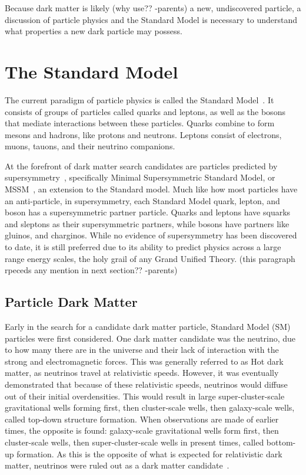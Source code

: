 Because dark matter is {\color{red}likely (why use?? -parents)} a new, undiscovered particle, a discussion of particle physics and the Standard Model is necessary to understand what properties a new dark particle may possess.

\section{The Standard Model}

The current paradigm of particle physics is called the Standard Model~\cite{standardmodel}.
It consists of groups of particles called quarks and leptons, as well as the bosons that mediate interactions between these particles.
Quarks combine to form mesons and hadrons, like protons and neutrons.
Leptons consist of electrons, muons, tauons, and their neutrino companions.

At the forefront of dark matter search candidates are particles predicted by supersymmetry~\cite{Jungman:1995df}, specifically Minimal Supersymmetric Standard Model, or MSSM~\cite{MSSM,supersym1}, an extension to the Standard model.
Much like how most particles have an anti-particle, in supersymmetry, each Standard Model quark, lepton, and boson has a supersymmetric partner particle.
Quarks and leptons have squarks and sleptons as their supersymmetric partners, while bosons have partners like gluinos, and charginos.
While no evidence of supersymmetry has been discovered to date, it is still preferred due to its ability to predict physics across a large range energy scales, the holy grail of any Grand Unified Theory.
{\color{red}(this paragraph rpeceds any mention in next section?? -parents)}


\subsection{Particle Dark Matter}\label{sec_particledm}

Early in the search for a candidate dark matter particle, Standard Model (SM) particles were first considered.
One dark matter candidate was the neutrino, due to how many there are in the universe and their lack of interaction with the strong and electromagnetic forces.
This was generally referred to as Hot dark matter, as neutrinos travel at relativistic speeds.
However, it was eventually demonstrated that because of these relativistic speeds, neutrinos would diffuse out of their initial overdensities.
This would result in large super-cluster-scale gravitational wells forming first, then cluster-scale wells, then galaxy-scale wells, called top-down structure formation.
When observations are made of earlier times, the opposite is found: galaxy-scale gravitational wells form first, then cluster-scale wells, then super-cluster-scale wells in present times, called bottom-up formation.
As this is the opposite of what is expected for relativistic dark matter, neutrinos were ruled out as a dark matter candidate~\cite{neutrinoHeirarchical}.

